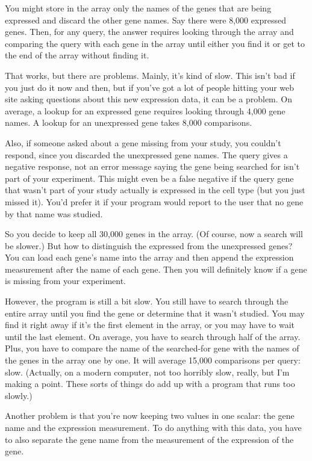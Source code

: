 You might store in the array only the names of the genes that are being expressed and discard the other gene names. Say there were 8,000 expressed genes. Then, for any query, the answer requires looking through the array and comparing the query with each gene in the array until either you find it or get to the end of the array without finding it.

That works, but there are problems. Mainly, it's kind of slow. This isn't bad if you just do it now and then, but if you've got a lot of people hitting your web site asking questions about this new expression data, it can be a problem. On average, a lookup for an expressed gene requires looking through 4,000 gene names. A lookup for an unexpressed gene takes 8,000 comparisons.

Also, if someone asked about a gene missing from your study, you couldn't respond, since you discarded the unexpressed gene names. The query gives a negative response, not an error message saying the gene being searched for isn't part of your experiment. This might even be a false negative if the query gene that wasn't part of your study actually is expressed in the cell type (but you just missed it). You'd prefer it if your program would report to the user that no gene by that name was studied.

So you decide to keep all 30,000 genes in the array. (Of course, now a search will be slower.) But how to distinguish the expressed from the unexpressed genes? You can load each gene's name into the array and then append the expression measurement after the name of each gene. Then you will definitely know if a gene is missing from your experiment.

However, the program is still a bit slow. You still have to search through the entire array until you find the gene or determine that it wasn't studied. You may find it right away if it's the first element in the array, or you may have to wait until the last element. On average, you have to search through half of the array. Plus, you have to compare the name of the searched-for gene with the names of the genes in the array one by one. It will average 15,000 comparisons per query: slow.  (Actually, on a modern computer, not too horribly slow, really, but I'm making a point. These sorts of things do add up with a program that runs too slowly.)

Another problem is that you're now keeping two values in one scalar: the gene name and the expression measurement. To do anything with this data, you have to also separate the gene name from the measurement of the expression of the gene.

